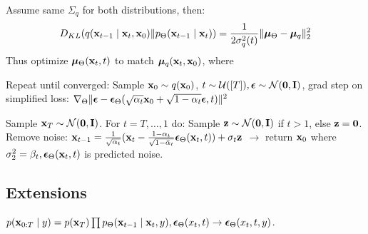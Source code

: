 
\begin{definition}[Training]
    Assume same \(\Sigma_q\) for both distributions, then:
    \[D_{KL}(q(\vb{x}_{t-1} \mid \vb{x}_t, \vb{x}_0) \Vert p_{\Theta}(\vb{x}_{t-1} \mid \vb{x}_t)) = \frac{1}{2\sigma_q^2(t)}\Vert\vb*{\mu}_{\Theta} - \vb*{\mu}_q\Vert_2^2\]
    Thus optimize \(\vb*{\mu}_{\Theta}(\vb{x}_t, t)\) to match \(\vb*{\mu}_q(\vb{x}_t, \vb{x}_0)\), where

    \vspace{-12pt}

    Repeat until converged: Sample \(\vb{x}_0 \sim q(\vb{x}_0)\), \(t \sim \operatorname{\mathcal{U}}([T]), \vb*{\epsilon} \sim \operatorname{\mathcal{N}}(\vb{0}, \vb{I})\), grad step on simplified loss: \(\nabla_{\Theta} \Vert\vb*{\epsilon} - \vb*{\epsilon}_{\Theta}(\sqrt{\alpha_t}\vb{x}_0 + \sqrt{1 - \alpha_t}\vb*{\epsilon}, t)\Vert^2\)
\end{definition}

\begin{definition}[Sampling]
    Sample \(\vb{x}_T \sim \operatorname{\mathcal{N}}(\vb{0}, \vb{I})\). For \(t = T, \ldots, 1\) do:
    Sample \(\vb{z} \sim \operatorname{\mathcal{N}}(\vb{0}, \vb{I})\) if \(t > 1\), else \(\vb{z} = \vb{0}\). Remove noise: \(\vb{x}_{t-1} = \frac{1}{\sqrt{\alpha_t}}(\vb{x}_t - \frac{1 - \alpha_t}{\sqrt{1 - \bar{\alpha}_t}}\vb*{\epsilon}_{\Theta}(\vb{x}_t, t)) + \sigma_t \vb{z}\) \(\to\) return \(\vb{x}_0\) where
    \(\sigma_2^2 = \beta_t, \vb*{\epsilon}_{\Theta}(\vb{x}_t, t)\) is predicted noise.
\end{definition}

\subsection{Extensions}
\begin{definition}[Conditional]
    \(p(\vb{x}_{0:T} \mid y) = p(\vb{x}_T)\prod p_{\Theta}(\vb{x}_{t-1} \mid \vb{x}_t, y), \vb*{\epsilon}_{\Theta}(x_t, t) \to \vb*{\epsilon}_{\Theta}(x_t, t, y)\).
\end{definition}

